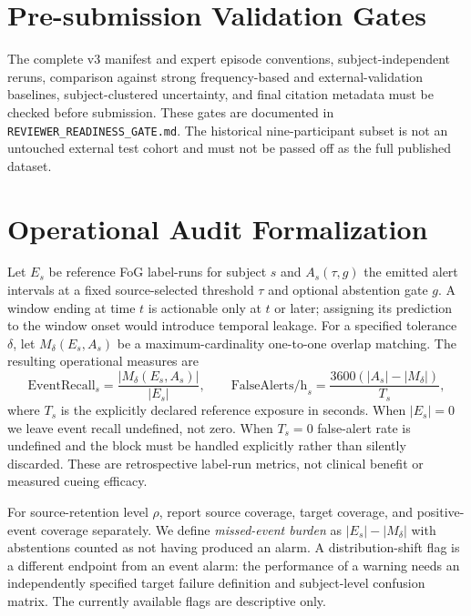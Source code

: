 \documentclass[sigconf,review,anonymous]{acmart}
\begin{document}
\section{Pre-submission Validation Gates}
The complete v3 manifest and expert episode conventions, subject-independent reruns, comparison against strong frequency-based and external-validation baselines, subject-clustered uncertainty, and final citation metadata must be checked before submission. These gates are documented in \texttt{REVIEWER\_READINESS\_GATE.md}. The historical nine-participant subset is not an untouched external test cohort and must not be passed off as the full published dataset.

\section{Operational Audit Formalization}
Let $E_s$ be reference FoG label-runs for subject $s$ and $A_s(\tau,g)$ the emitted alert intervals at a fixed source-selected threshold $\tau$ and optional abstention gate $g$. A window ending at time $t$ is actionable only at $t$ or later; assigning its prediction to the window onset would introduce temporal leakage. For a specified tolerance $\delta$, let $M_\delta(E_s,A_s)$ be a maximum-cardinality one-to-one overlap matching. The resulting operational measures are
\begin{equation}
\mathrm{EventRecall}_s=\frac{|M_\delta(E_s,A_s)|}{|E_s|},\qquad
\mathrm{FalseAlerts/h}_s=\frac{3600(|A_s|-|M_\delta|)}{T_s},
\end{equation}
where $T_s$ is the explicitly declared reference exposure in seconds. When $|E_s|=0$ we leave event recall undefined, not zero. When $T_s=0$ false-alert rate is undefined and the block must be handled explicitly rather than silently discarded. These are retrospective label-run metrics, not clinical benefit or measured cueing efficacy.

For source-retention level $\rho$, report source coverage, target coverage, and positive-event coverage separately. We define \emph{missed-event burden} as $|E_s|-|M_\delta|$ with abstentions counted as not having produced an alarm. A distribution-shift flag is a different endpoint from an event alarm: the performance of a warning needs an independently specified target failure definition and subject-level confusion matrix. The currently available flags are descriptive only.
\end{document}
